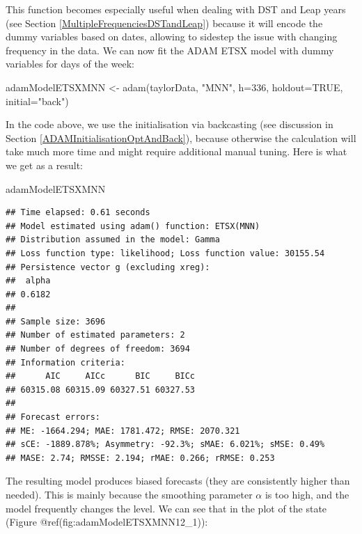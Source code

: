 \documentclass[
]{book}
\newenvironment{Shaded}{\begin{snugshade}}{\end{snugshade}}
\newcommand{\AttributeTok}[1]{\textcolor[rgb]{0.77,0.63,0.00}{#1}}
\newcommand{\ConstantTok}[1]{\textcolor[rgb]{0.00,0.00,0.00}{#1}}
\newcommand{\DecValTok}[1]{\textcolor[rgb]{0.00,0.00,0.81}{#1}}
\newcommand{\FunctionTok}[1]{\textcolor[rgb]{0.00,0.00,0.00}{#1}}
\newcommand{\NormalTok}[1]{#1}
\newcommand{\OtherTok}[1]{\textcolor[rgb]{0.56,0.35,0.01}{#1}}
\newcommand{\StringTok}[1]{\textcolor[rgb]{0.31,0.60,0.02}{#1}}
\theoremstyle{definition}
\theoremstyle{definition}
\theoremstyle{definition}
\theoremstyle{definition}
\theoremstyle{remark}
\begin{document}
This function becomes especially useful when dealing with DST and Leap years (see Section \ref{MultipleFrequenciesDSTandLeap}) because it will encode the dummy variables based on dates, allowing to sidestep the issue with changing frequency in the data. We can now fit the ADAM ETSX model with dummy variables for days of the week:

\begin{Shaded}
\begin{Highlighting}[]
\NormalTok{adamModelETSXMNN }\OtherTok{\textless{}{-}} \FunctionTok{adam}\NormalTok{(taylorData, }\StringTok{"MNN"}\NormalTok{, }\AttributeTok{h=}\DecValTok{336}\NormalTok{, }\AttributeTok{holdout=}\ConstantTok{TRUE}\NormalTok{,}
                         \AttributeTok{initial=}\StringTok{"back"}\NormalTok{)}
\end{Highlighting}
\end{Shaded}

In the code above, we use the initialisation via backcasting (see discussion in Section \ref{ADAMInitialisationOptAndBack}), because otherwise the calculation will take much more time and might require additional manual tuning. Here is what we get as a result:

\begin{Shaded}
\begin{Highlighting}[]
\NormalTok{adamModelETSXMNN}
\end{Highlighting}
\end{Shaded}

\begin{verbatim}
## Time elapsed: 0.61 seconds
## Model estimated using adam() function: ETSX(MNN)
## Distribution assumed in the model: Gamma
## Loss function type: likelihood; Loss function value: 30155.54
## Persistence vector g (excluding xreg):
##  alpha 
## 0.6182 
## 
## Sample size: 3696
## Number of estimated parameters: 2
## Number of degrees of freedom: 3694
## Information criteria:
##      AIC     AICc      BIC     BICc 
## 60315.08 60315.09 60327.51 60327.53 
## 
## Forecast errors:
## ME: -1664.294; MAE: 1781.472; RMSE: 2070.321
## sCE: -1889.878%; Asymmetry: -92.3%; sMAE: 6.021%; sMSE: 0.49%
## MASE: 2.74; RMSSE: 2.194; rMAE: 0.266; rRMSE: 0.253
\end{verbatim}

The resulting model produces biased forecasts (they are consistently higher than needed). This is mainly because the smoothing parameter \(\alpha\) is too high, and the model frequently changes the level. We can see that in the plot of the state (Figure @ref(fig:adamModelETSXMNN12\_1)):
\end{document}
